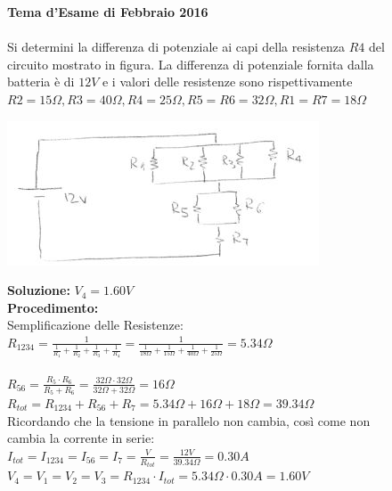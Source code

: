 \begin{figure}[h!]
\textbf{Tema d'Esame di Febbraio 2016}\\ \\
Si determini la differenza di potenziale ai capi della resistenza $R4$ del circuito mostrato in figura. La differenza di potenziale fornita dalla batteria è di $12V$ e i valori delle resistenze sono rispettivamente $R2=15\Omega, R3=40\Omega,R4=25\Omega, R5=R6=32\Omega, R1=R7=18\Omega$
	\begin{center}
		\includegraphics[scale=1.1]{ES5/FEB052016.jpg}
	\end{center}
	\begin{boxed}
		\null\hfill \textbf{Soluzione:} $V_4 = 1.60 V$\\
		\textbf{Procedimento: } \\
		Semplificazione delle Resistenze:\\
		
		$R_{1234}=\frac{1}{\frac{1}{R_1}+\frac{1}{R_2}+\frac{1}{R_3}+\frac{1}{R_4}}=\frac{1}{\frac{1}{18\Omega}+\frac{1}{15\Omega}+\frac{1}{40\Omega}+\frac{1}{25\Omega}}=5.34\Omega$\\ \\ 
		$R_{56}=\frac{R_5\cdot R_6}{R_5+R_6}=\frac{32\Omega\cdot 32\Omega}{32\Omega+32\Omega}=16\Omega$\\ 
		$R_{tot}=R_{1234}+R_{56}+R_7=5.34\Omega+16\Omega+18\Omega=39.34\Omega$\\
		Ricordando che la tensione in parallelo non cambia, così come non cambia la corrente in serie:\\
		$I_{tot}=I_{1234}=I_{56}=I_7=\frac{V}{R_{tot}}=\frac{12V}{39.34\Omega}=0.30A$\\
		$V_4=V_1=V_2=V_3=R_{1234}\cdot I_{tot}=5.34\Omega\cdot 0.30A=1.60V$
	\end{boxed}
\end{figure}

